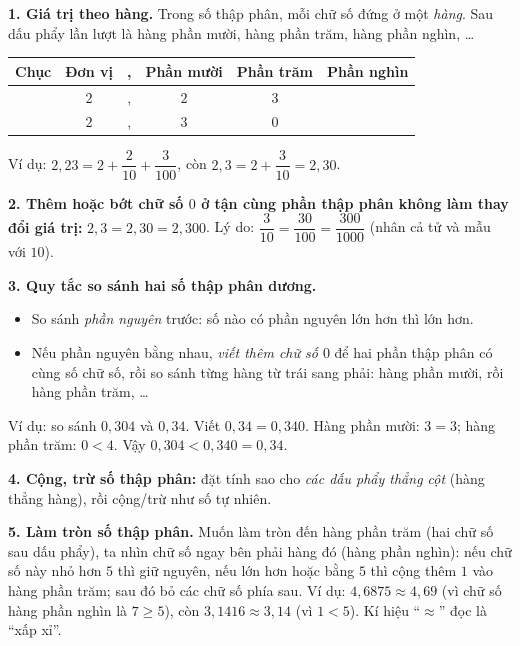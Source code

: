 \begin{knowbox}
\textbf{1. Giá trị theo hàng.} Trong số thập phân, mỗi chữ số đứng ở một \emph{hàng}. Sau dấu phẩy lần lượt là
hàng phần mười, hàng phần trăm, hàng phần nghìn, \ldots
\begin{center}
\renewcommand{\arraystretch}{1.25}
\begin{tabular}{|c|c|c|c|c|c|}
\hline
\rowcolor{tmBlue!10} Chục & Đơn vị & , & Phần mười & Phần trăm & Phần nghìn\\ \hline
 & $2$ & , & $2$ & $3$ & \\ \hline
 & $2$ & , & $3$ & $0$ & \\ \hline
\end{tabular}
\end{center}
Ví dụ: $2{,}23 = 2 + \dfrac{2}{10} + \dfrac{3}{100}$, còn $2{,}3 = 2 + \dfrac{3}{10} = 2{,}30$.

\textbf{2. Thêm hoặc bớt chữ số $0$ ở tận cùng phần thập phân không làm thay đổi giá trị:}
$2{,}3 = 2{,}30 = 2{,}300$. Lý do: $\dfrac{3}{10} = \dfrac{30}{100} = \dfrac{300}{1000}$ (nhân cả tử và mẫu với $10$).

\textbf{3. Quy tắc so sánh hai số thập phân dương.}
\begin{itemize}[leftmargin=1.4em,itemsep=1pt,topsep=2pt]
  \item So sánh \emph{phần nguyên} trước: số nào có phần nguyên lớn hơn thì lớn hơn.
  \item Nếu phần nguyên bằng nhau, \emph{viết thêm chữ số $0$} để hai phần thập phân có cùng số chữ số, rồi so sánh
  từng hàng từ trái sang phải: hàng phần mười, rồi hàng phần trăm, \ldots
\end{itemize}
Ví dụ: so sánh $0{,}304$ và $0{,}34$. Viết $0{,}34 = 0{,}340$. Hàng phần mười: $3 = 3$; hàng phần trăm: $0 < 4$.
Vậy $0{,}304 < 0{,}340 = 0{,}34$.

\textbf{4. Cộng, trừ số thập phân:} đặt tính sao cho \emph{các dấu phẩy thẳng cột} (hàng thẳng hàng), rồi cộng/trừ
như số tự nhiên.

\textbf{5. Làm tròn số thập phân.} Muốn làm tròn đến hàng phần trăm (hai chữ số sau dấu phẩy), ta nhìn chữ số ngay
bên phải hàng đó (hàng phần nghìn): nếu chữ số này nhỏ hơn $5$ thì giữ nguyên, nếu lớn hơn hoặc bằng $5$ thì cộng thêm
$1$ vào hàng phần trăm; sau đó bỏ các chữ số phía sau. Ví dụ: $4{,}6875 \approx 4{,}69$ (vì chữ số hàng phần nghìn là
$7 \ge 5$), còn $3{,}1416 \approx 3{,}14$ (vì $1 < 5$). Kí hiệu ``$\approx$'' đọc là ``xấp xỉ''.
\end{knowbox}
